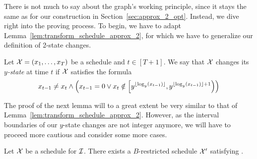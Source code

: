 There is not much to say about the graph's working principle, since it stays the same as for our construction in Section~\ref{sec:approx_2_opt}. Instead, we dive right into the proving process. To begin, we have to adapt Lemma~\ref{lem:transform_schedule_approx_2}, for which we have to generalize our definition of 2-state changes.
\begin{defn}\label{defn:y_state_changes}
Let $\mathcal{X}=(x_1,\dotsc,x_T)$ be a schedule and $t\in[T+1]$. We say that $\mathcal{X}$ changes its \emph{$y$-state} at time $t$ if $\mathcal{X}$ satisfies the formula
\begin{equation*}
	x_{t-1}\neq x_t\land \left(x_{t-1}=0 \lor x_t\notin\left[y^{\lfloor\log_y(x_{t-1})\rfloor},y^{\lfloor\log_y(x_{t-1})\rfloor+1}\right)\right)
\end{equation*}
\end{defn}
The proof of the next lemma will to a great extent be very similar to that of Lemma~\ref{lem:transform_schedule_approx_2}. However, as the interval boundaries of our $y$-state changes are not integer anymore, we will have to proceed more cautious and consider some more cases.
\begin{lem}
Let $\mathcal{X}$ be a schedule for $\mathcal{I}$. There exists a $B$-restricted schedule $\mathcal{X}'$ satisfying .
\end{lem}
